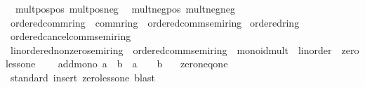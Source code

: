 \begin{isabellebody}
\ \ mult{\isacharunderscore}{\kern0pt}pos{\isacharunderscore}{\kern0pt}pos\ mult{\isacharunderscore}{\kern0pt}pos{\isacharunderscore}{\kern0pt}neg\isanewline
\ \ mult{\isacharunderscore}{\kern0pt}neg{\isacharunderscore}{\kern0pt}pos\ mult{\isacharunderscore}{\kern0pt}neg{\isacharunderscore}{\kern0pt}neg\isanewline
\isanewline
{}\isamarkupfalse%
\ ordered{\isacharunderscore}{\kern0pt}comm{\isacharunderscore}{\kern0pt}ring\ {\isacharequal}{\kern0pt}\ comm{\isacharunderscore}{\kern0pt}ring\ {\isacharplus}{\kern0pt}\ ordered{\isacharunderscore}{\kern0pt}comm{\isacharunderscore}{\kern0pt}semiring\isanewline
{}\isanewline
\isanewline
{}\isamarkupfalse%
\ ordered{\isacharunderscore}{\kern0pt}ring%
\isadelimproof
\ %
\endisadelimproof
%
\isatagproof
\isacommand{{\isachardot}{\kern0pt}{\isachardot}{\kern0pt}}\isamarkupfalse%
%
\endisatagproof
{\isafoldproof}%
%
\isadelimproof
%
\endisadelimproof
\isanewline
{}\isamarkupfalse%
\ ordered{\isacharunderscore}{\kern0pt}cancel{\isacharunderscore}{\kern0pt}comm{\isacharunderscore}{\kern0pt}semiring%
\isadelimproof
\ %
\endisadelimproof
%
\isatagproof
\isacommand{{\isachardot}{\kern0pt}{\isachardot}{\kern0pt}}\isamarkupfalse%
%
\endisatagproof
{\isafoldproof}%
%
\isadelimproof
%
\endisadelimproof
\isanewline
\isanewline
{}\isamarkupfalse%
\isanewline
\isanewline
{}\isamarkupfalse%
\ linordered{\isacharunderscore}{\kern0pt}nonzero{\isacharunderscore}{\kern0pt}semiring\ {\isacharequal}{\kern0pt}\ ordered{\isacharunderscore}{\kern0pt}comm{\isacharunderscore}{\kern0pt}semiring\ {\isacharplus}{\kern0pt}\ monoid{\isacharunderscore}{\kern0pt}mult\ {\isacharplus}{\kern0pt}\ linorder\ {\isacharplus}{\kern0pt}\ zero{\isacharunderscore}{\kern0pt}less{\isacharunderscore}{\kern0pt}one\ {\isacharplus}{\kern0pt}\isanewline
\ \ \ add{\isacharunderscore}{\kern0pt}mono{}{\isacharcolon}{\kern0pt}\ {\isachardoublequoteopen}a\ {\isacharless}{\kern0pt}\ b\ {\isasymLongrightarrow}\ a\ {\isacharplus}{\kern0pt}\ {}\ {\isacharless}{\kern0pt}\ b\ {\isacharplus}{\kern0pt}\ {}{\isachardoublequoteclose}\isanewline
{}\isanewline
\isanewline
{}\isamarkupfalse%
\ zero{\isacharunderscore}{\kern0pt}neq{\isacharunderscore}{\kern0pt}one\isanewline
%
\isadelimproof
\ \ %
\endisadelimproof
%
\isatagproof
{}\isamarkupfalse%
\ standard\ {\isacharparenleft}{\kern0pt}insert\ zero{\isacharunderscore}{\kern0pt}less{\isacharunderscore}{\kern0pt}one{\isacharcomma}{\kern0pt}\ blast{\isacharparenright}{\kern0pt}%

\end{isabellebody}
